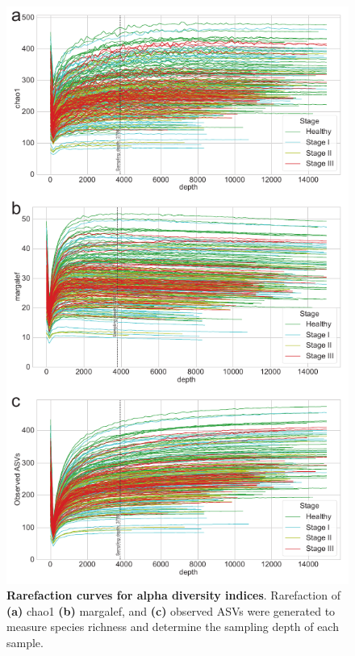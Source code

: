 \documentclass[11pt, a4paper, onecolumn, oneside]{report}
\begin{document}
            \begin{figure}[p]
                \centering
                \includegraphics[width=12 cm]{Figures/Periodontitis/Figure_S1.pdf}
                \caption[Rarefaction curves for alpha diversity indices]{\textbf{Rarefaction curves for alpha diversity indices}. Rarefaction of \textbf{(a)} chao1 \textbf{(b)} margalef, and \textbf{(c)} observed ASVs were generated to measure species richness and determine the sampling depth of each sample.}
                \label{fig:Periodontitis-rarefaction}
            \end{figure}
            \clearpage
\end{document}

